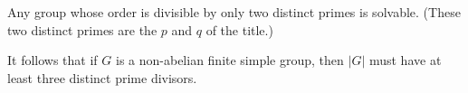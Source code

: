 \documentclass[12pt]{article}
\begin{document}
Any group whose order is divisible by only two distinct primes is solvable.
(These two distinct primes are the $p$ and $q$ of the title.)

It follows that if $G$ is a non-abelian finite simple group, then $|G|$ must have at least three distinct prime divisors.

\end{document}

